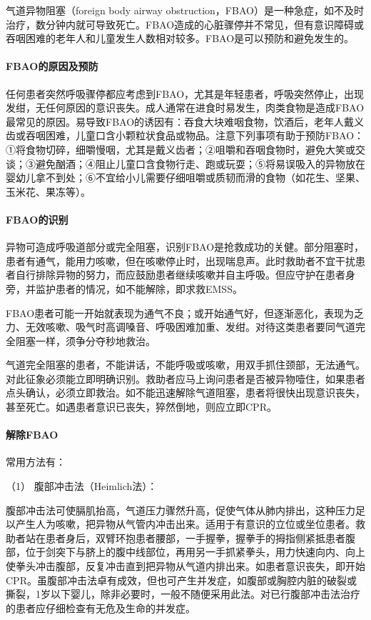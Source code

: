 气道异物阻塞（foreign body airway
obstruction，FBAO）是一种急症，如不及时治疗，数分钟内就可导致死亡。FBAO造成的心脏骤停并不常见，但有意识障碍或吞咽困难的老年人和儿童发生人数相对较多。FBAO是可以预防和避免发生的。

\paragraph{FBAO的原因及预防}

任何患者突然呼吸骤停都应考虑到FBAO，尤其是年轻患者，呼吸突然停止，出现发绀，无任何原因的意识丧失。成人通常在进食时易发生，肉类食物是造成FBAO最常见的原因。易导致FBAO的诱因有：吞食大块难咽食物，饮酒后，老年人戴义齿或吞咽困难，儿童口含小颗粒状食品或物品。注意下列事项有助于预防FBAO：①将食物切碎，细嚼慢咽，尤其是戴义齿者；②咀嚼和吞咽食物时，避免大笑或交谈；③避免酗酒；④阻止儿童口含食物行走、跑或玩耍；⑤将易误吸入的异物放在婴幼儿拿不到处；⑥不宜给小儿需要仔细咀嚼或质韧而滑的食物（如花生、坚果、玉米花、果冻等）。

\paragraph{FBAO的识别}

异物可造成呼吸道部分或完全阻塞，识别FBAO是抢救成功的关健。部分阻塞时，患者有通气，能用力咳嗽，但在咳嗽停止时，出现喘息声。此时救助者不宜干扰患者自行排除异物的努力，而应鼓励患者继续咳嗽并自主呼吸。但应守护在患者身旁，并监护患者的情况，如不能解除，即求救EMSS。

FBAO患者可能一开始就表现为通气不良；或开始通气好，但逐渐恶化，表现为乏力、无效咳嗽、吸气时高调嗓音、呼吸困难加重、发绀。对待这类患者要同气道完全阻塞一样，须争分夺秒地救治。

气道完全阻塞的患者，不能讲话，不能呼吸或咳嗽，用双手抓住颈部，无法通气。对此征象必须能立即明确识别。救助者应马上询问患者是否被异物噎住，如果患者点头确认，必须立即救治。如不能迅速解除气道阻塞，患者将很快出现意识丧失，甚至死亡。如遇患者意识已丧失，猝然倒地，则应立即CPR。

\paragraph{解除FBAO}

常用方法有：

\hypertarget{text00283.htmlux5cux23CHP10-1-4-5-3-1}{}
（1） 腹部冲击法（Heimlich法）：

腹部冲击法可使膈肌抬高，气道压力骤然升高，促使气体从肺内排出，这种压力足以产生人为咳嗽，把异物从气管内冲击出来。适用于有意识的立位或坐位患者。救助者站在患者身后，双臂环抱患者腰部，一手握拳，握拳手的拇指侧紧抵患者腹部，位于剑突下与脐上的腹中线部位，再用另一手抓紧拳头，用力快速向内、向上使拳头冲击腹部，反复冲击直到把异物从气道内排出来。如患者意识丧失，即开始CPR。虽腹部冲击法卓有成效，但也可产生并发症，如腹部或胸腔内脏的破裂或撕裂，1岁以下婴儿，除非必要时，一般不随便采用此法。对已行腹部冲击法治疗的患者应仔细检查有无危及生命的并发症。

